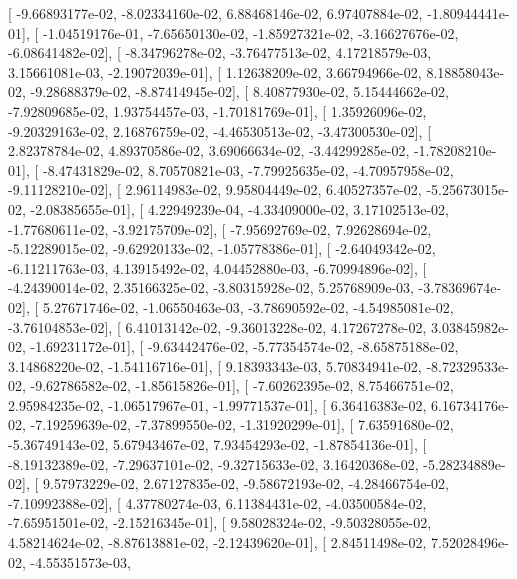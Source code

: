 \documentclass{article}
\begin{document}
       [ -9.66893177e-02,  -8.02334160e-02,   6.88468146e-02,
          6.97407884e-02,  -1.80944441e-01],
       [ -1.04519176e-01,  -7.65650130e-02,  -1.85927321e-02,
         -3.16627676e-02,  -6.08641482e-02],
       [ -8.34796278e-02,  -3.76477513e-02,   4.17218579e-03,
          3.15661081e-03,  -2.19072039e-01],
       [  1.12638209e-02,   3.66794966e-02,   8.18858043e-02,
         -9.28688379e-02,  -8.87414945e-02],
       [  8.40877930e-02,   5.15444662e-02,  -7.92809685e-02,
          1.93754457e-03,  -1.70181769e-01],
       [  1.35926096e-02,  -9.20329163e-02,   2.16876759e-02,
         -4.46530513e-02,  -3.47300530e-02],
       [  2.82378784e-02,   4.89370586e-02,   3.69066634e-02,
         -3.44299285e-02,  -1.78208210e-01],
       [ -8.47431829e-02,   8.70570821e-03,  -7.79925635e-02,
         -4.70957958e-02,  -9.11128210e-02],
       [  2.96114983e-02,   9.95804449e-02,   6.40527357e-02,
         -5.25673015e-02,  -2.08385655e-01],
       [  4.22949239e-04,  -4.33409000e-02,   3.17102513e-02,
         -1.77680611e-02,  -3.92175709e-02],
       [ -7.95692769e-02,   7.92628694e-02,  -5.12289015e-02,
         -9.62920133e-02,  -1.05778386e-01],
       [ -2.64049342e-02,  -6.11211763e-03,   4.13915492e-02,
          4.04452880e-03,  -6.70994896e-02],
       [ -4.24390014e-02,   2.35166325e-02,  -3.80315928e-02,
          5.25768909e-03,  -3.78369674e-02],
       [  5.27671746e-02,  -1.06550463e-03,  -3.78690592e-02,
         -4.54985081e-02,  -3.76104853e-02],
       [  6.41013142e-02,  -9.36013228e-02,   4.17267278e-02,
          3.03845982e-02,  -1.69231172e-01],
       [ -9.63442476e-02,  -5.77354574e-02,  -8.65875188e-02,
          3.14868220e-02,  -1.54116716e-01],
       [  9.18393343e-03,   5.70834941e-02,  -8.72329533e-02,
         -9.62786582e-02,  -1.85615826e-01],
       [ -7.60262395e-02,   8.75466751e-02,   2.95984235e-02,
         -1.06517967e-01,  -1.99771537e-01],
       [  6.36416383e-02,   6.16734176e-02,  -7.19259639e-02,
         -7.37899550e-02,  -1.31920299e-01],
       [  7.63591680e-02,  -5.36749143e-02,   5.67943467e-02,
          7.93454293e-02,  -1.87854136e-01],
       [ -8.19132389e-02,  -7.29637101e-02,  -9.32715633e-02,
          3.16420368e-02,  -5.28234889e-02],
       [  9.57973229e-02,   2.67127835e-02,  -9.58672193e-02,
         -4.28466754e-02,  -7.10992388e-02],
       [  4.37780274e-03,   6.11384431e-02,  -4.03500584e-02,
         -7.65951501e-02,  -2.15216345e-01],
       [  9.58028324e-02,  -9.50328055e-02,   4.58214624e-02,
         -8.87613881e-02,  -2.12439620e-01],
       [  2.84511498e-02,   7.52028496e-02,  -4.55351573e-03,
\end{document}
